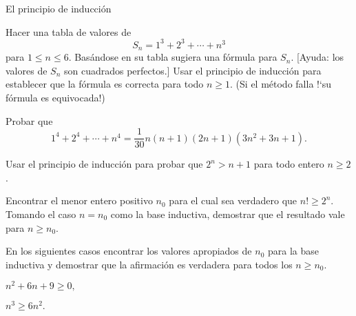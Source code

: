 \begin{section}{El principio de inducción}
\begin{enumex}
\item Hacer una tabla de valores de
$$
S_n = 1^3+2^3+\cdots +n^3
$$
para $1 \le n\le 6$. Basándose en su tabla sugiera una fórmula para $S_n$. [Ayuda: los valores de $S_n$ son cuadrados perfectos.] Usar el principio de inducción para establecer que la fórmula es correcta para todo $n\ge 1$. (Si el método falla !`su fórmula es equivocada!)

\item Probar que
$$
1^4+2^4+\cdots+n^4= \frac{1}{30}n(n+1)(2n+1)(3n^2+3n+1).
$$
\item Usar el principio de inducción para probar que $2^n>n+1$ para todo entero $n\ge2$.

\item Encontrar el menor entero positivo $n_0$ para el cual sea verdadero que $n! \ge 2^n$. Tomando el caso $n=n_0$ como la base inductiva, demostrar que el resultado vale para $n\ge n_0$.

\item En los siguientes casos encontrar los valores apropiados de $n_0$ para la base inductiva y demostrar que la afirmación es verdadera
para todos los $n\ge n_0$.
\begin{enumex}
    \item $n^2 +6n + 9 \ge 0,$
    \item $n^3 \ge 6n^2.$
\end{enumex}
\end{enumex}
\end{section}